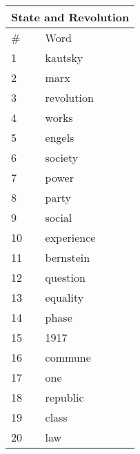 \documentclass{pnastwo}
\begin{document}
\begin{article}
\begin{center}
  \begin{tabular}{ | l | l | }
    \hline
    \multicolumn{2}{|c|}{State and Revolution} \\ \hline
    \# & Word  \\ \hline
1 & kautsky \\ \hline
2 & marx \\ \hline
3 & revolution \\ \hline
4 & works \\ \hline
5 & engels \\ \hline
6 & society \\ \hline
7 & power \\ \hline
8 & party \\ \hline
9 & social \\ \hline
10 & experience \\ \hline
11 & bernstein \\ \hline
12 & question \\ \hline
13 & equality \\ \hline
14 & phase \\ \hline
15 & 1917 \\ \hline
16 & commune \\ \hline
17 & one \\ \hline
18 & republic \\ \hline
19 & class \\ \hline
20 & law \\ \hline
  \end{tabular}
\end{center}


\end{article}
\end{document}
